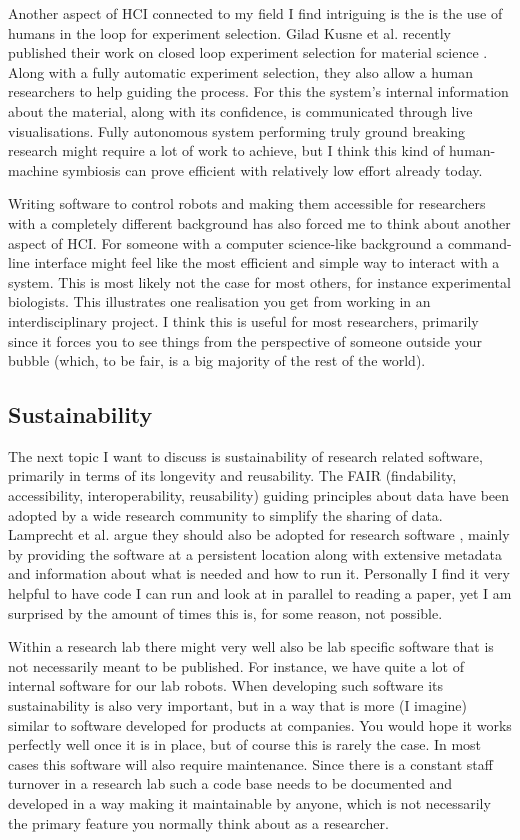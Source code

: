 \documentclass[11pt]{article}
\begin{document}
Another aspect of HCI connected to my field I find intriguing is the is the use of humans in the loop for experiment selection. Gilad Kusne et al. recently published their work on closed loop experiment selection for material science \cite{kusne_--fly_2020}. Along with a fully automatic experiment selection, they also allow a human researchers to help guiding the process. For this the system's internal information about the material, along with its confidence, is communicated through live visualisations. Fully autonomous system performing truly ground breaking research might require a lot of work to achieve, but I think this kind of human-machine symbiosis can prove efficient with relatively low effort already today.

Writing software to control robots and making them accessible for researchers with a completely different background has also forced me to think about another aspect of HCI. For someone with a computer science-like background a command-line interface might feel like the most efficient and simple way to interact with a system. This is most likely not the case for most others, for instance experimental biologists. This illustrates one realisation you get from working in an interdisciplinary project. I think this is useful for most researchers, primarily since it forces you to see things from the perspective of someone outside your bubble (which, to be fair, is a big majority of the rest of the world).

\subsection*{Sustainability}
The next topic I want to discuss is sustainability of research related software, primarily in terms of its longevity and reusability. The FAIR (findability, accessibility, interoperability, reusability) guiding principles about data have been adopted by a wide research community to simplify the sharing of data. Lamprecht et al. argue they should also be adopted for research software \cite{lamprecht_towards_2020}, mainly by providing the software at a persistent location along with extensive metadata and information about what is needed and how to run it. Personally I find it very helpful to have code I can run and look at in parallel to reading a paper, yet I am surprised by the amount of times this is, for some reason, not possible.

Within a research lab there might very well also be lab specific software that is not necessarily meant to be published. For instance, we have quite a lot of internal software for our lab robots. When developing such software its sustainability is also very important, but in a way that is more (I imagine) similar to software developed for products at companies. You would hope it works perfectly well once it is in place, but of course this is rarely the case. In most cases this software will also require maintenance. Since there is a constant staff turnover in a research lab such a code base needs to be documented and developed in a way making it maintainable by anyone, which is not necessarily the primary feature you normally think about as a researcher.
\end{document}
